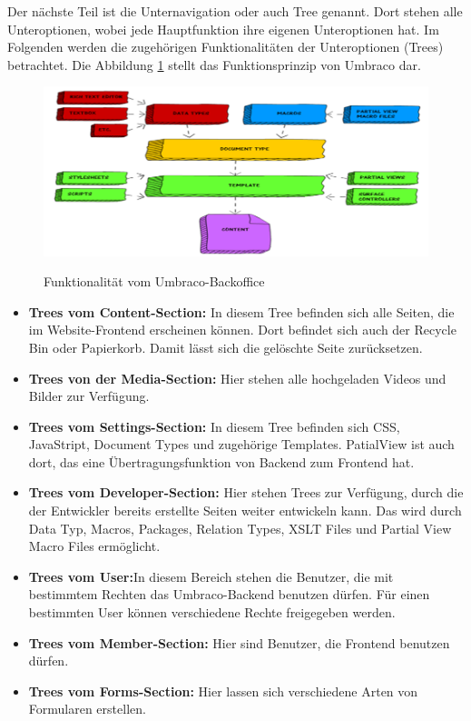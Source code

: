 Der nächste Teil ist die Unternavigation oder auch Tree genannt. Dort stehen alle Unteroptionen, wobei jede Hauptfunktion ihre eigenen Unteroptionen hat. Im Folgenden werden die zugehörigen Funktionalitäten der Unteroptionen (Trees) betrachtet. Die Abbildung \ref{fig:UmbracoFunktionalitaet} stellt das Funktionsprinzip von Umbraco \cite{UmbracoHQ2018Backofficeoverview} dar.

\begin{figure}[h]
	\centering
	\includegraphics[width=1\linewidth]{Graphics/umbracoAufbau.png}
	\caption[Umbraco Backoffice]{Funktionalität vom Umbraco-Backoffice}\cite{droombiz2018}
	\label{fig:UmbracoFunktionalitaet}
\end{figure} 

\begin{itemize}	
	\item\textbf{Trees vom Content-Section:} In diesem Tree befinden sich alle Seiten, die im Website-Frontend erscheinen können. Dort befindet sich auch der Recycle Bin oder Papierkorb. Damit lässt sich die gelöschte Seite zurücksetzen.
	\item\textbf{Trees von der Media-Section:} Hier stehen alle hochgeladen Videos und Bilder zur Verfügung.
	\item\textbf{Trees vom Settings-Section:} In diesem Tree befinden sich CSS, JavaStript, Document Types und zugehörige Templates. PatialView ist auch dort, das eine Übertragungsfunktion von Backend zum Frontend hat.
	\item\textbf{Trees vom Developer-Section:} Hier stehen Trees zur Verfügung, durch die der Entwickler bereits erstellte Seiten weiter entwickeln kann. Das wird durch Data Typ, Macros, Packages, Relation Types, XSLT Files und Partial View Macro Files ermöglicht.
	\item\textbf{Trees vom User:}In diesem Bereich stehen die Benutzer, die mit bestimmtem Rechten das Umbraco-Backend benutzen dürfen. Für einen bestimmten User können verschiedene Rechte freigegeben werden. 
	\item\textbf{Trees vom Member-Section:} Hier sind Benutzer, die Frontend benutzen dürfen.
	\item\textbf{Trees vom Forms-Section: } Hier lassen sich verschiedene Arten von Formularen erstellen.
\end{itemize}

